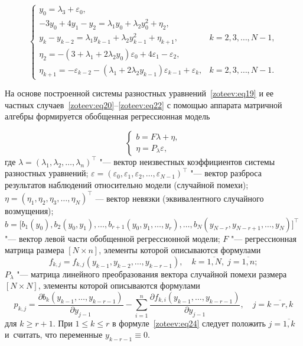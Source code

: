 \begin{itemize}
\begin{equation}
\left\{
\begin{array}{ll}
y_0=\lambda_3+\varepsilon_0, \\
-3y_0+4y_1-y_2=\lambda_1y_0+\lambda_2y_0^2+\eta_2, \\
y_k-y_{k-2}=\lambda_1y_{k-1}+\lambda_2y_{k-1}^2+\eta_{k+1}, & k=2,3,\dots,N-1, \\
\eta_2=-(3+\lambda_1+2\lambda_2y_0)\varepsilon_0+4\varepsilon_1-\varepsilon_2,  \\
\eta_{k+1}=-\varepsilon_{k-2}-(\lambda_1+2\lambda_2y_{k-1})\varepsilon_{k-1}+\varepsilon_k, & k=2,3,\dots,N-1.
\end{array}
\right.
\label{zoteev:eq22}
\end{equation}
\end{itemize}

На основе построенной системы разностных уравнений~\eqref{zoteev:eq19} и ее частных случаев~\eqref{zoteev:eq20}--\eqref{zoteev:eq22} с помощью аппарата матричной алгебры формируется обобщенная регрессионная модель

\begin{equation}
\left\{
\begin{array}{l}
{b=F\lambda+\eta,} \\
{\eta=P_\lambda \varepsilon,}
\end{array}
\right.
\label{zoteev:eq23}
\end{equation}
где $\lambda=(\lambda_1,\lambda_2,\dots,\lambda_n)^{\top}$ "--- вектор неизвестных коэффициентов системы разностных уравнений; $\varepsilon=(\varepsilon_0,\varepsilon_1,\varepsilon_2,\dots,\varepsilon_{N-1})^{\top}$ "--- вектор разброса результатов наблюдений относительно модели (случайной помехи);
$\eta=(\eta_1,\eta_2,\eta_3,\dots,\eta_N)^{\top}$ --- вектор невязки (эквивалентного случайного возмущения);\\
 $b=\bigl[b_1(y_0),b_2(y_0,y_1),\dots,b_{r+1}(y_0,y_1,\dots,y_r),\dots,b_N(y_{N-r},y_{N-r+1},\dots,y_N)\bigr]^{\top}$ "--- вектор левой части обобщенной регрессионной модели; 
 $F$ "--- регрессионная матрица размера $[N{\times} n]$, элементы которой описываются формулами 
$$
 f_{k,j}=f_{k,j}(y_{k-1},y_{k-2},\dots,y_{k-r-1}),\quad  k=\overline{1,N},\; j=\overline{1,n};
$$
  $P_\lambda$ "--- матрица линейного преобразования вектора случайной помехи размера $[N {\times} N]$, элементы которой описываются формулами 
\begin{equation}
p_{k,j}=\dfrac{\partial b_k(y_{k-1},\dots,y_{k-r-1})}{\partial y_{j-1}}   -\sum_{i=1}^n\dfrac{\partial f_{k,i}(y_{k-1},\dots,y_{k-r-1})}{\partial y_{j-1}}, \quad %
j=\overline{k-r,k}
\label{zoteev:eq24}
\end{equation}
для $k\geq r+1$. При $1\leq k\leq r$ в формуле~\eqref{zoteev:eq24} следует положить $j=\overline{1,k}$ и~считать, что переменные $y_{k-r-1}\equiv 0$.

